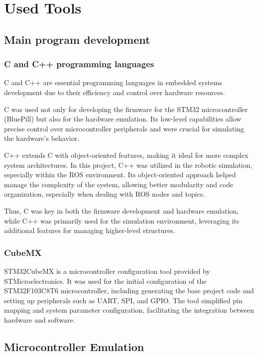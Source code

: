 \documentclass[../../monografia.tex]{subfiles}
\begin{document}
\chapter{Used Tools}

\section{Main program development}
\subsection{C and C++ programming languages}
C and C++ are essential programming languages in embedded systems development due to their efficiency and control over hardware resources.

C was used not only for developing the firmware for the STM32 microcontroller (BluePill) but also for the hardware emulation. Its low-level capabilities allow precise control over microcontroller peripherals and were crucial for simulating the hardware's behavior.

C++ extends C with object-oriented features, making it ideal for more complex system architectures. In this project, C++ was utilized in the robotic simulation, especially within the ROS environment. Its object-oriented approach helped manage the complexity of the system, allowing better modularity and code organization, especially when dealing with ROS nodes and topics.

Thus, C was key in both the firmware development and hardware emulation, while C++ was primarily used for the simulation environment, leveraging its additional features for managing higher-level structures.

\subsection{CubeMX}

STM32CubeMX is a microcontroller configuration tool provided by STMicroelectronics. It was used for the initial configuration of the STM32F103C8T6 microcontroller, including generating the base project code and setting up peripherals such as UART, SPI, and GPIO. The tool simplified pin mapping and system parameter configuration, facilitating the integration between hardware and software.

\section{Microcontroller Emulation}
\end{document}
